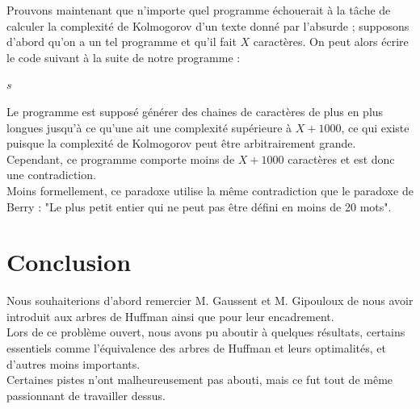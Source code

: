 \documentclass[a4paper, 12pt]{article}
\begin{document}
Prouvons maintenant que n'importe quel programme échouerait à la tâche de calculer la complexité de Kolmogorov d'un texte donné par l'absurde ; supposons d'abord qu'on a un tel programme et qu'il fait $X$ caractères. On peut alors écrire le code suivant à la suite de notre programme : \\

\begin{algorithm}
\begin{algorithmic}[1]
\State \Return $s$
\EndIf
\EndFor
\EndFor
\EndFunction
\end{algorithmic}
\end{algorithm}
\newpage
Le programme est supposé générer des chaines de caractères de plus en plus longues jusqu'à ce qu'une ait une complexité supérieure à $X+1000$, ce qui existe puisque la complexité de Kolmogorov peut être arbitrairement grande. Cependant, ce programme comporte moins de $X+1000$ caractères et est donc une contradiction. \\
Moins formellement, ce paradoxe utilise la même contradiction que le paradoxe de Berry : "Le plus petit entier qui ne peut pas être défini en moins de 20 mots".



\newpage

\section{Conclusion}

Nous souhaiterions d'abord remercier M. Gaussent et M. Gipouloux de nous avoir introduit aux arbres de Huffman ainsi que pour leur encadrement. \\

Lors de ce problème ouvert, nous avons pu aboutir à quelques résultats, certains essentiels comme l'équivalence des arbres de Huffman et leurs optimalités, et d'autres moins importants. \\
Certaines pistes n'ont malheureusement pas abouti, mais ce fut tout de même passionnant de travailler dessus. \\
\end{document}
